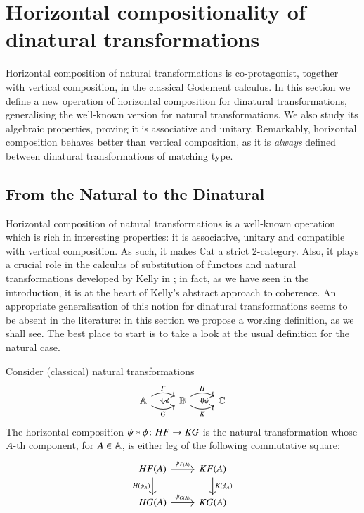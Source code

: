 \section{Horizontal compositionality of dinatural transformations}\label{chapter horizontal}

Horizontal composition of natural transformations is co-protagonist, together with vertical composition, in the classical Godement calculus. In this section we define a new operation of horizontal composition for dinatural transformations, generalising the well-known version for natural transformations. We also study its algebraic properties, proving it is associative and unitary. Remarkably, horizontal composition behaves better than vertical composition, as it is \emph{always} defined between dinatural transformations of matching type.

\subsection{From the Natural to the Dinatural}

Horizontal composition of natural transformations \cite{mac_lane_categories_1978} 
is a well-known operation which is rich in interesting properties: it is associative, unitary and compatible with vertical composition. As such, it makes $\mathbb{C}\mathrm{at}$ a strict 2-category. Also, it plays a crucial role in the calculus of substitution of functors and natural transformations developed by Kelly in \cite{kelly_many-variable_1972}; in fact, as we have seen in the introduction, it is at the heart of Kelly's abstract approach to coherence. 
An appropriate generalisation of this notion for dinatural transformations seems to be absent in the literature: in this section we propose a working definition, as we shall see. The best place to start is to take a look at the usual definition for the natural case.

\begin{definition}\label{def:horizontal composition natural transformations}
	Consider (classical) natural transformations
	\[
	\begin{tikzcd}
	\A \ar[r,bend left,"F"{above},""{name=F,below}]{} \ar[r,bend right,"G"{below},""{name=G}] 
	& \B \ar[r,bend left,"H"{above},""{name=H,below}]{} \ar[r,bend right,"K"{below},""{name=K}] 
	& \C	
	\arrow[Rightarrow,from=F,to=G,"\phi"]
	\arrow[Rightarrow,from=H,to=K,"\psi"]
	\end{tikzcd}
	\]
	The horizontal composition $\hc \fst \snd \colon HF \to KG$ is the natural transformation whose $A$-th component, for $A \in \mathbb A$, is either leg of the following commutative square:
	\begin{equation}\label{eqn:horCompNatTransfSquare}
	\mkern0mu \begin{tikzcd}
	HF(A) \ar[r,"\psi_{F(A)}"] \ar[d,"H(\phi_A)"'] & KF(A) \ar[d,"K(\phi_A)"] \\
	HG(A) \ar[r,"\psi_{G(A)}"] & KG(A)
	\end{tikzcd}
	\end{equation}
\end{definition}

